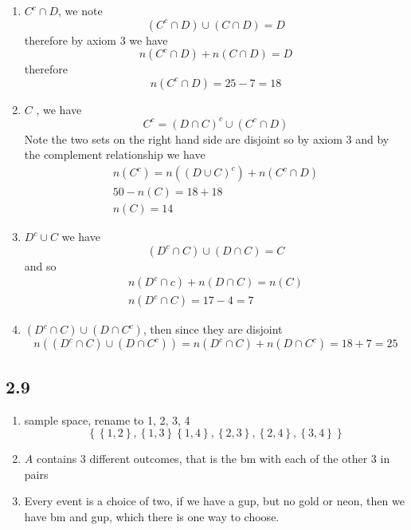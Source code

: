 \documentclass[11pt]{book}
\begin{document}
\begin{enumerate}[label=\alph*)]
    \item $C^{c} \cap D$,  we note
        \[
            \left( C^{c} \cap D \right) \cup \left( C\cap D \right) = D
        \]
        therefore by axiom 3 we have 
        \[
        n\left(C^{c} \cap D\right)  + n\left(C\cap D\right) = D
        \]
        therefore 
        \[
        n\left(C^{c} \cap D\right) = 25  - 7 = 18
        \]
    \item $C$ , we have 
        \[
            C^{c} = \left( D\cap C \right) ^{c} \cup \left( C^{c} \cap D \right) 
        \]
        Note the two sets on the right hand side are disjoint so by axiom 3 and by the complement relationship we have 
        \begin{gather*}
            n\left(C^{c} \right) = n\left(\left( D \cup  C \right) ^{c} \right)  + n\left(C^{c} \cap D\right) \tag{By axiom 3}\\
            50  - n\left(C\right) = 18  + 18 \tag{Complement}\\
            n\left(C\right) = 14
        \end{gather*}
    \item $D^{c} \cup C$ we have 
        \[
            \left( D^{c} \cap C \right) \cup \left( D\cap C \right) = C
        \]
        and so 
        \begin{gather*}
            n\left(D^{c} \cap c\right)  + n\left(D\cap C\right) = n\left(C\right) \\
            n\left(D^{c} \cap C\right) = 17  - 4 = 7
        \end{gather*}
    \item $\left( D^{c} \cap C \right) \cup \left( D\cap C^{c} \right) $, then since they are disjoint 
        \[
            n\left(\left( D^{c} \cap C \right) \cup \left( D\cap C^{c}  \right) \right) = n\left(D^{c} \cap C\right)  + n\left(D\cap C^{c} \right) = 18  + 7 = 25
        \]
\end{enumerate}


\subsection{2.9}%
\label{sub:2_9}

\begin{enumerate}[label=\alph*)]
    \item sample space, rename to 1, 2, 3, 4
        \[
        \left\{ \left\{ 1,2 \right\} ,\left\{ 1,3 \right\} \left\{ 1,4 \right\} ,\left\{ 2,3 \right\} ,\left\{ 2,4 \right\} ,\left\{ 3,4 \right\}  \right\} 
        \]
    \item $A$ contains 3 different outcomes, that is the bm with each of the other 3 in pairs 
    \item Every event is a choice of two, if we have a gup, but no gold or neon, then we have bm and gup, which there is one way to choose.
\end{enumerate}
\end{document}
